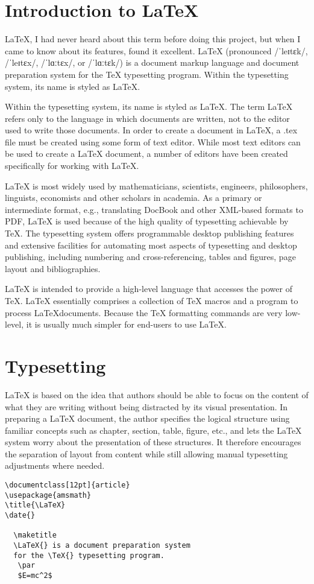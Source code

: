 \section{Introduction to \LaTeX}

\LaTeX, I had never heard about this term before doing this project,
but when I came to know about its features, found it excellent. 
\LaTeX{} (pronounced /ˈleɪtɛk/, /ˈleɪtɛx/, /ˈlɑːtɛx/, or /ˈlɑːtɛk/) is a 
document markup language and document preparation system for the \TeX{} 
typesetting  program. Within the typesetting system, its name is styled 
as \LaTeX.


Within the typesetting system, its name is styled as \LaTeX. The term 
\LaTeX{} refers only to the language in which documents are written, 
not to the editor used to write those documents. In order to create a 
document in \LaTeX, a .tex file must be created using some form of text 
editor. While most text editors can be used to create a \LaTeX{} document, 
a number of editors have been created specifically for working with \LaTeX.

\LaTeX{} is most widely used by mathematicians, scientists, 
engineers, philosophers, linguists, economists and other scholars in 
academia. As a primary or intermediate format, e.g., translating DocBook 
and other XML-based formats to PDF, \LaTeX{} is used because of the 
high quality of typesetting achievable by \TeX. The typesetting system 
offers programmable desktop publishing features and extensive facilities 
for automating most aspects of typesetting and desktop publishing, 
including numbering and cross-referencing, tables and figures, 
page layout and bibliographies.

\LaTeX{} is intended to provide a high-level language that
accesses the power of \TeX. \LaTeX{} essentially comprises a
collection of \TeX{} macros and a program to process \LaTeX documents. 
Because the \TeX{} formatting commands are very low-level, it is usually 
much simpler for end-users to use \LaTeX{}.


\section{Typesetting}
\LaTeX{} is based on the idea that authors should be able to focus on 
the content of what they are writing without being distracted by its 
visual presentation. In preparing a \LaTeX{} document, the author 
specifies the logical structure using familiar concepts such as 
chapter, section, table, figure, etc., and lets the \LaTeX{} system 
worry about the presentation of these structures. It therefore 
encourages the separation of layout from content while still allowing 
manual typesetting adjustments where needed. 

\begin{verbatim}
\documentclass[12pt]{article}
\usepackage{amsmath}
\title{\LaTeX}
\date{}

  \maketitle 
  \LaTeX{} is a document preparation system 
  for the \TeX{} typesetting program.
   \par 
   $E=mc^2$

\end{verbatim}
